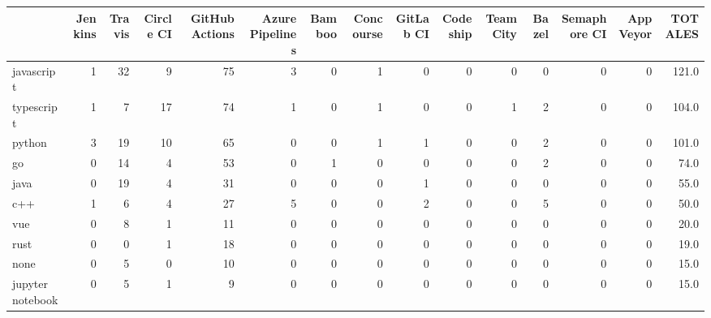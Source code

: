 \begin{tabular}{lrrrrrrrrrrrrrr}
\toprule
{} &  Jenkins &  Travis &  Circle CI &  GitHub Actions &  Azure Pipelines &  Bamboo &  Concourse &  GitLab CI &  Codeship &  TeamCity &  Bazel &  Semaphore CI &  AppVeyor &  TOTALES \\
\midrule
javascript       &        1 &      32 &          9 &              75 &                3 &       0 &          1 &          0 &         0 &         0 &      0 &             0 &         0 &    121.0 \\
typescript       &        1 &       7 &         17 &              74 &                1 &       0 &          1 &          0 &         0 &         1 &      2 &             0 &         0 &    104.0 \\
python           &        3 &      19 &         10 &              65 &                0 &       0 &          1 &          1 &         0 &         0 &      2 &             0 &         0 &    101.0 \\
go               &        0 &      14 &          4 &              53 &                0 &       1 &          0 &          0 &         0 &         0 &      2 &             0 &         0 &     74.0 \\
java             &        0 &      19 &          4 &              31 &                0 &       0 &          0 &          1 &         0 &         0 &      0 &             0 &         0 &     55.0 \\
c++              &        1 &       6 &          4 &              27 &                5 &       0 &          0 &          2 &         0 &         0 &      5 &             0 &         0 &     50.0 \\
vue              &        0 &       8 &          1 &              11 &                0 &       0 &          0 &          0 &         0 &         0 &      0 &             0 &         0 &     20.0 \\
rust             &        0 &       0 &          1 &              18 &                0 &       0 &          0 &          0 &         0 &         0 &      0 &             0 &         0 &     19.0 \\
none             &        0 &       5 &          0 &              10 &                0 &       0 &          0 &          0 &         0 &         0 &      0 &             0 &         0 &     15.0 \\
jupyter notebook &        0 &       5 &          1 &               9 &                0 &       0 &          0 &          0 &         0 &         0 &      0 &             0 &         0 &     15.0 \\

\end{tabular}
